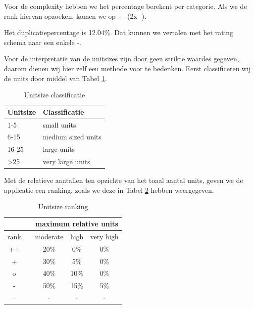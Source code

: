 \documentclass[a4paper]{article}
\begin{document}
Voor de complexity hebben we het percentage berekent per categorie. Als we de rank hiervan opzoeken, komen we op - - (2x -).

Het duplicatiepercentage is 12.04\%. Dat kunnen we vertalen met het rating schema naar een enkele -.

Voor de interpretatie van de unitsizes zijn door \cite{A} geen strikte waardes gegeven, daarom dienen wij hier zelf een methode voor te bedenken.
Eerst classificeren wij de units door middel van Tabel \ref{tbl:UnitSizeClassificatie}.

\begin{table}[h]
\caption{Unitsize classificatie}
\label{tbl:UnitSizeClassificatie}
\begin{tabular}{|l|l|}
\hline
Unitsize         & Classificatie      \\ \hline
1-5              & small units        \\
6-15             & medium sized units \\
16-25            & large units        \\
\textgreater{}25 & very large units   \\ \hline
\end{tabular}
\end{table}

Met de relatieve aantallen ten opzichte van het toaal aantal units, geven we de applicatie een ranking, zoals we deze in Tabel \ref{tbl:UnitsizeRanking} hebben weergegeven.

\begin{table}[h]
\caption{Unitsize ranking}
\label{tbl:UnitsizeRanking}
\begin{tabular}{cl|lll|}
\cline{3-5}
\multicolumn{1}{l}{}       &  & \multicolumn{3}{c|}{maximum relative units}                                              \\ \hline
\multicolumn{1}{|c|}{rank} &  & \multicolumn{1}{c}{moderate} & \multicolumn{1}{c}{high} & \multicolumn{1}{c|}{very high} \\ \hline
\multicolumn{1}{|c|}{++}   &  & \multicolumn{1}{c}{20\%}     & \multicolumn{1}{c}{0\%}  & \multicolumn{1}{c|}{0\%}       \\
\multicolumn{1}{|c|}{+}    &  & \multicolumn{1}{c}{30\%}     & \multicolumn{1}{c}{5\%}  & \multicolumn{1}{c|}{0\%}       \\
\multicolumn{1}{|c|}{o}    &  & \multicolumn{1}{c}{40\%}     & \multicolumn{1}{c}{10\%} & \multicolumn{1}{c|}{0\%}       \\
\multicolumn{1}{|c|}{-}    &  & \multicolumn{1}{c}{50\%}     & \multicolumn{1}{c}{15\%} & \multicolumn{1}{c|}{5\%}       \\
\multicolumn{1}{|c|}{--}   &  & \multicolumn{1}{c}{-}        & \multicolumn{1}{c}{-}    & \multicolumn{1}{c|}{-}         \\ \hline
\end{tabular}
\end{table}
\end{document}

